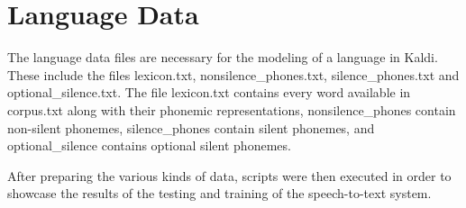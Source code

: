 \section{Language Data}

The language data files are necessary for the modeling of a language in Kaldi. These include the files lexicon.txt, nonsilence_phones.txt, silence_phones.txt and optional_silence.txt. The file lexicon.txt contains every word available in corpus.txt along with their phonemic representations, nonsilence_phones contain non-silent phonemes, silence_phones contain silent phonemes, and optional_silence contains optional silent phonemes.

After preparing the various kinds of data, scripts were then executed in order to showcase the results of the testing and training of the speech-to-text system.



